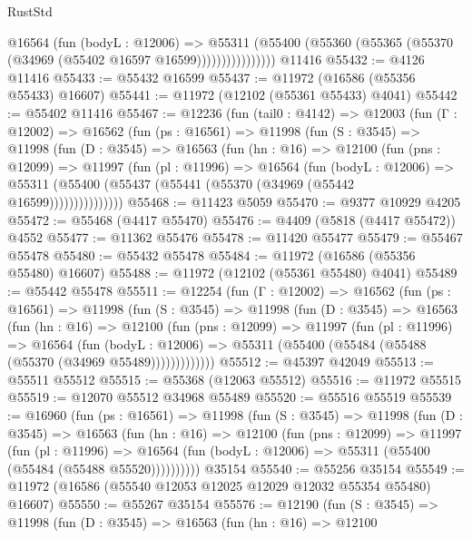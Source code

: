 \begin{lexlean}{RustStd}
\begin{coremodule}
                    @16564
                      (fun (bodyL : @12006) =>
                      @55311
                        (@55400
                          (@55360 (@55365 (@55370 (@34969 (@55402 @16597 @16599))))))))))))))))
    @11416
@55432 := @4126 @11416
@55433 := @55432 @16599
@55437 := @11972 (@16586 (@55356 @55433) @16607)
@55441 := @11972 (@12102 (@55361 @55433) @4041)
@55442 := @55402 @11416
@55467 := @12236
    (fun (tail0 : @4142) =>
    @12003
      (fun (Γ : @12002) =>
      @16562
        (fun (ps : @16561) =>
        @11998
          (fun (S : @3545) =>
          @11998
            (fun (D : @3545) =>
            @16563
              (fun (hn : @16) =>
              @12100
                (fun (pns : @12099) =>
                @11997
                  (fun (pl : @11996) =>
                  @16564
                    (fun (bodyL : @12006) =>
                    @55311 (@55400 (@55437 (@55441 (@55370 (@34969 (@55442 @16599)))))))))))))))
@55468 := @11423 @5059
@55470 := @9377 @10929 @4205
@55472 := @55468 (@4417 @55470)
@55476 := @4409 (@5818 (@4417 @55472)) @4552
@55477 := @11362 @55476
@55478 := @11420 @55477
@55479 := @55467 @55478
@55480 := @55432 @55478
@55484 := @11972 (@16586 (@55356 @55480) @16607)
@55488 := @11972 (@12102 (@55361 @55480) @4041)
@55489 := @55442 @55478
@55511 := @12254
    (fun (Γ : @12002) =>
    @16562
      (fun (ps : @16561) =>
      @11998
        (fun (S : @3545) =>
        @11998
          (fun (D : @3545) =>
          @16563
            (fun (hn : @16) =>
            @12100
              (fun (pns : @12099) =>
              @11997
                (fun (pl : @11996) =>
                @16564
                  (fun (bodyL : @12006) =>
                  @55311 (@55400 (@55484 (@55488 (@55370 (@34969 @55489)))))))))))))
@55512 := @45397 @42049
@55513 := @55511 @55512
@55515 := @55368 (@12063 @55512)
@55516 := @11972 @55515
@55519 := @12070 @55512 @34968 @55489
@55520 := @55516 @55519
@55539 := @16960
    (fun (ps : @16561) =>
    @11998
      (fun (S : @3545) =>
      @11998
        (fun (D : @3545) =>
        @16563
          (fun (hn : @16) =>
          @12100
            (fun (pns : @12099) =>
            @11997
              (fun (pl : @11996) =>
              @16564 (fun (bodyL : @12006) => @55311 (@55400 (@55484 (@55488 @55520))))))))))
    @35154
@55540 := @55256 @35154
@55549 := @11972 (@16586 (@55540 @12053 @12025 @12029 @12032 @55354 @55480) @16607)
@55550 := @55267 @35154
@55576 := @12190
    (fun (S : @3545) =>
    @11998
      (fun (D : @3545) =>
      @16563
        (fun (hn : @16) =>
        @12100

\end{coremodule}
\end{lexlean}
